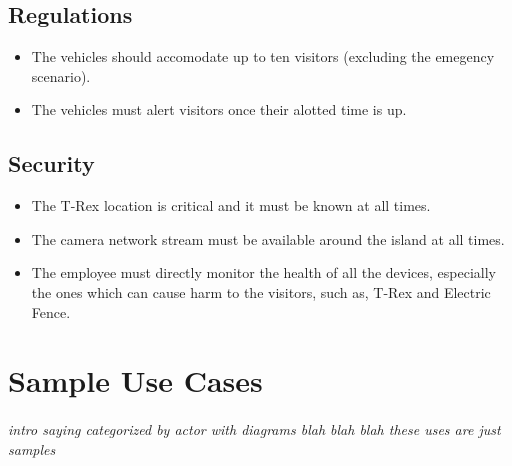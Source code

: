 \documentclass[12pt]{article}
\begin{document}
	\subsection{Regulations}
	\begin{itemize}
		\item The vehicles should accomodate up to ten visitors (excluding the emegency scenario).
		\item The vehicles must alert visitors once their alotted time is up. 
	\end{itemize}

	\subsection{Security}
	\begin{itemize}
		\item The T-Rex location is critical and it must be known at all times.
		\item The camera network stream must be available around the island at all times.
		\item The employee must directly monitor the health of all the devices, especially the ones which can cause harm to the visitors, such as, T-Rex and Electric Fence. 
	\end{itemize}

\section{Sample Use Cases}
\paragraph{} \textit{intro saying categorized by actor with diagrams blah blah blah these uses are just samples}
\end{document}
